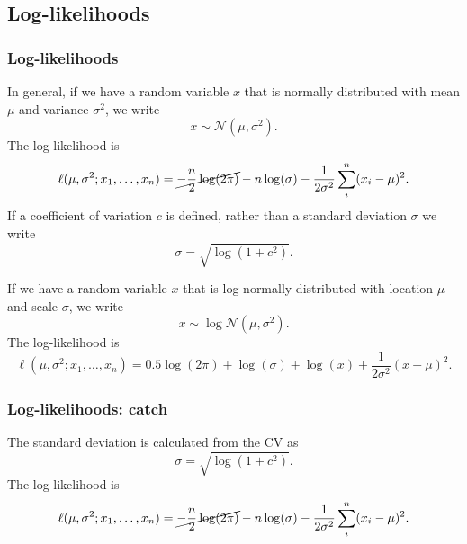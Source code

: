 \documentclass{beamer}
\begin{document}
\subsection{Log-likelihoods}
\begin{frame}
\frametitle{Log-likelihoods}
In general, if we have a random variable $x$ that is normally distributed with
mean $\mu$ and variance $\sigma^2$, we write
\begin{equation*}
  x \sim \mathcal{N} \left(\mu, \sigma^2 \right).
\end{equation*}
The log-likelihood is
\begin{equation*}
  \ell(\mu,\sigma^2; x_1,\ldots,x_n) = \cancel{-\frac{n}{2} \log (2 \pi)} - n \log (\sigma) -
  \frac{1}{2\sigma^2} \sum_i^n (x_i - \mu)^2.
\end{equation*}
If a coefficient of variation $c$ is defined, rather than a standard deviation
$\sigma$ we write
\begin{equation*}
  \sigma = \sqrt{\log \left( 1+c^2 \right)}.
\end{equation*}


If we have a random variable $x$ that is log-normally distributed with
location $\mu$ and scale $\sigma$, we write
\begin{equation*}
  x \sim \log \mathcal{N} \left(\mu, \sigma^2 \right).
\end{equation*}
The log-likelihood is
\begin{equation*}
  \ell(\mu,\sigma^2; x_1,\ldots,x_n) = 0.5 \log (2 \pi) + \log (\sigma) + \log
  (x) + \frac{1}{2\sigma^2} (x - \mu)^2.
\end{equation*}
\end{frame}


\begin{frame}
\frametitle{Log-likelihoods: catch}
The standard deviation is calculated from the CV as
\begin{equation*}
  \sigma = \sqrt{\log \left( 1+c^2 \right)}.
\end{equation*}
The log-likelihood is
\begin{equation*}
  \ell(\mu,\sigma^2; x_1,\ldots,x_n) = \cancel{-\frac{n}{2} \log (2 \pi)} - n \log (\sigma) -
  \frac{1}{2\sigma^2} \sum_i^n (x_i - \mu)^2.
\end{equation*}
\end{frame}

\end{document}
